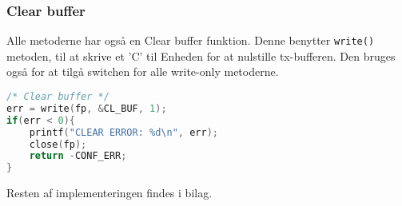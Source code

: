 \subsubsection*{Clear buffer}

Alle metoderne har også en Clear buffer funktion. Denne benytter \verb+write()+ metoden, til at skrive et 'C' til Enheden for at nulstille tx-bufferen. Den bruges også for at tilgå switchen for alle write-only metoderne.

\begin{lstlisting}[language=C]
/* Clear buffer */
err = write(fp, &CL_BUF, 1);
if(err < 0){
	printf("CLEAR ERROR: %d\n", err);
	close(fp);
	return -CONF_ERR;
}
\end{lstlisting}

Resten af implementeringen findes i bilag.